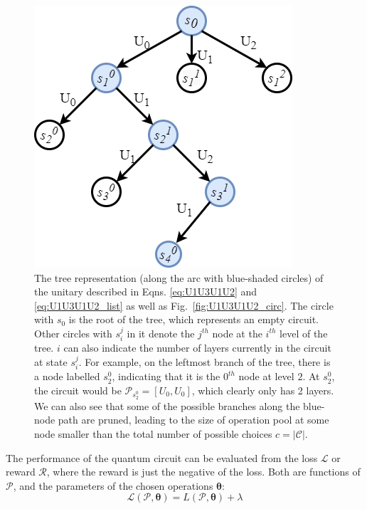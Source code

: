 \documentclass[a4paper,onecolumn,11pt]{quantumarticle}
\begin{document}
\begin{figure}[H]
  \centering
  \includegraphics[width=0.4\linewidth]{Figures/tree_example.png}
  \caption{The tree representation (along the arc with blue-shaded circles) of the unitary described in Eqns. \ref{eq:U1U3U1U2} and \ref{eq:U1U3U1U2_list} as well as Fig.~\ref{fig:U1U3U1U2_circ}. The circle with $s_0$ is the root of the tree, which represents an empty circuit. Other circles with $s_i^j$ in it denote the $j^{th}$ node at the $i^{th}$ level of the tree. $i$ can also indicate the number of layers currently in the circuit at state $s_i^j$. For example, on the leftmost branch of the tree, there is a node labelled $s_2^0$, indicating that it is the $0^{th}$ node at level $2$. At $s_2^0$, the circuit would be $\mathcal{P}_{s_2^0}=[U_0, U_0]$, which clearly only has 2 layers. We can also see that some of the possible branches along the blue-node path are pruned, leading to the size of operation pool at some node smaller than the total number of possible choices $c = \vert \mathcal{C}\vert$.}
  \label{fig:treeexample}
\end{figure}

The performance of the quantum circuit can be evaluated from the loss $\mathcal{L}$ or reward $\mathcal{R}$, where the reward is just the negative of the loss. Both are functions of $\mathcal{P}$, and the parameters of the chosen operations $\boldsymbol{\theta}$:
\begin{equation}
    \mathcal{L}(\mathcal{P},\boldsymbol{\theta})=L(\mathcal{P}, \boldsymbol{\theta})+\lambda
\end{equation}
\end{document}

